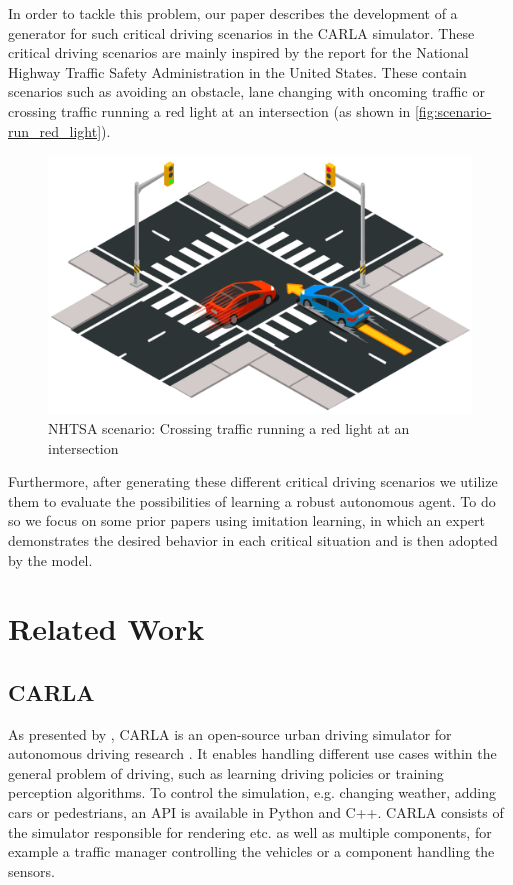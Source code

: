 \documentclass[conference, a4paper, 11pt]{IEEEtran}
\begin{document}
In order to tackle this problem, our paper describes the development of a generator for such critical driving scenarios in the CARLA simulator.
These critical driving scenarios are mainly inspired by the report  \cite{NHTSA:PreCrashScenarios} for the National Highway Traffic Safety Administration in the United States.
These contain scenarios such as avoiding an obstacle, lane changing with oncoming traffic or crossing traffic running a red light at an intersection (as shown in \autoref{fig:scenario-run_red_light}).

\begin{figure}[ht]
    \centering
    \includegraphics[width=0.7\linewidth]{figures/scenario-run_red_light.png}
    \caption{NHTSA scenario: Crossing traffic running a red light at an intersection \cite{CARLAChallenge:Scenarios}}
    \label{fig:scenario-run_red_light}
\end{figure}

Furthermore, after generating these different critical driving scenarios we utilize them to evaluate the possibilities of learning a robust autonomous agent.
To do so we focus on some prior papers using imitation learning, in which an expert demonstrates the desired behavior in each critical situation and is then adopted by the model.

\section{Related Work}

\subsection{CARLA}
As presented by \citeauthor{Dosovitskiy17:CARLA}, CARLA is an open-source urban driving simulator for autonomous driving research \cite{Dosovitskiy17:CARLA}.
It enables handling different use cases within the general problem of driving, such as learning driving policies or training perception algorithms.
To control the simulation, e.g. changing weather, adding cars or pedestrians, an API is available in Python and C++.
CARLA consists of the simulator responsible for rendering etc. as well as multiple components, for example a traffic manager controlling the vehicles or a component handling the sensors.
\end{document}

